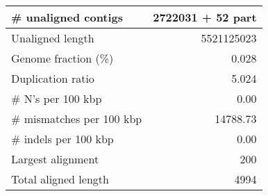 \documentclass[12pt,a4paper]{article}
\begin{document}
\begin{table}[ht]
\begin{center}
\begin{tabular}{|l*{1}{|r}|}
\# unaligned contigs & 2722031 + 52 part \\ \hline
Unaligned length & 5521125023 \\ \hline
Genome fraction (\%) & 0.028 \\ \hline
Duplication ratio & 5.024 \\ \hline
\# N's per 100 kbp & 0.00 \\ \hline
\# mismatches per 100 kbp & 14788.73 \\ \hline
\# indels per 100 kbp & 0.00 \\ \hline
Largest alignment & 200 \\ \hline
Total aligned length & 4994 \\ \hline
\end{tabular}
\end{center}
\end{table}
\end{document}
